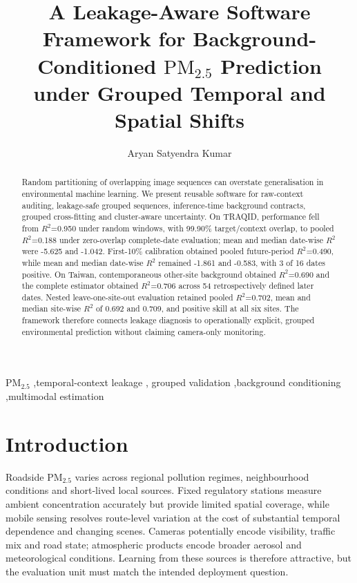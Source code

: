 \documentclass[review,12pt,authoryear]{elsarticle}
\newcommand{\PM}[1]{\ensuremath{\mathrm{PM}_{#1}}}
\newcommand{\pmfine}{\PM{2.5}}
\newcommand{\Rtwo}{\ensuremath{R^2}}
\begin{document}
\begin{frontmatter}

\title{A Leakage-Aware Software Framework for Background-Conditioned
\pmfine{} Prediction under Grouped Temporal and Spatial Shifts}

\author[nitgoa]{Aryan Satyendra Kumar}
\address[nitgoa]{National Institute of Technology Goa, Kottamoll Plateau,
Cuncolim Municipal Area, Salcete Taluka, South Goa District, Goa 403703, India}

\begin{abstract}
Random partitioning of overlapping image sequences can overstate generalisation
in environmental machine learning. We present reusable software for raw-context
auditing, leakage-safe grouped sequences, inference-time background contracts,
grouped cross-fitting and cluster-aware uncertainty. On TRAQID, performance fell
from \Rtwo=0.950 under random windows, with 99.90\% target/context overlap, to
pooled \Rtwo=0.188 under zero-overlap complete-date evaluation; mean and median
date-wise \Rtwo{} were -5.625 and -1.042. First-10\% calibration obtained pooled
future-period \Rtwo=0.490, while mean and median date-wise \Rtwo{} remained
-1.861 and -0.583, with 3 of 16 dates positive. On Taiwan, contemporaneous
other-site background obtained \Rtwo=0.690 and the complete estimator obtained
\Rtwo=0.706 across 54 retrospectively defined later dates. Nested
leave-one-site-out evaluation retained pooled \Rtwo=0.702, mean and median
site-wise \Rtwo{} of 0.692 and 0.709, and positive skill at all six sites. The
framework therefore connects leakage diagnosis to operationally explicit,
grouped environmental prediction without claiming camera-only monitoring.
\end{abstract}

\begin{keyword}
\pmfine{} \sep temporal-context leakage \sep
grouped validation \sep background conditioning \sep multimodal estimation
\end{keyword}

\end{frontmatter}

\section{Introduction}

Roadside \pmfine{} varies across regional pollution regimes, neighbourhood
conditions and short-lived local sources. Fixed regulatory stations measure
ambient concentration accurately but provide limited spatial coverage, while
mobile sensing resolves route-level variation at the cost of substantial
temporal dependence and changing scenes. Cameras potentially encode visibility,
traffic mix and road state; atmospheric products encode broader aerosol and
meteorological conditions. Learning from these sources is therefore attractive,
but the evaluation unit must match the intended deployment question.
\end{document}
